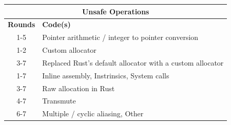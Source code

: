 \centering
\small
\begin{tabular}{|cp{10cm}|}
\hline
\multicolumn{2}{|c|}{\textbf{Unsafe Operations}}                                                                          \\ \hline
\multicolumn{1}{|c|}{\textbf{Rounds}} & \textbf{Code(s)}                                                                  \\ \hline
\multicolumn{1}{|c|}{1-5}             & Pointer arithmetic / integer to pointer conversion                                \\ \hline
\multicolumn{1}{|c|}{1-2}             & Custom allocator                                                                  \\
\multicolumn{1}{|c|}{3-7}             & Replaced Rust's default allocator with a custom allocator                         \\ \hline

\multicolumn{1}{|c|}{1-7}             & Inline assembly, Instrinsics, System calls                                        \\ \hline
\multicolumn{1}{|c|}{3-7}             & Raw allocation in Rust \\ \hline
\multicolumn{1}{|c|}{4-7}             & Transmute                                                                         \\ \hline
\multicolumn{1}{|c|}{6-7}             & Multiple / cyclic aliasing, Other                                                 \\ \hline
\end{tabular}